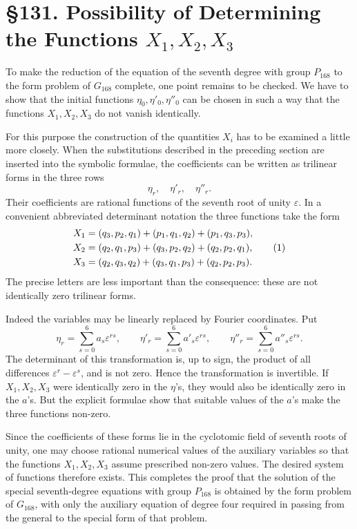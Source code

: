 \documentclass[12pt,a4paper]{article}
\newcommand{\webersection}[2]{\clearpage\section*{\S #1. #2}}
\newcommand{\eps}{\varepsilon}
\begin{document}
\webersection{131}{Possibility of Determining the Functions \(X_1,X_2,X_3\)}

To make the reduction of the equation of the seventh degree with group \(P_{168}\) to the form problem of \(G_{168}\) complete, one point remains to be checked.  We have to show that the initial functions \(\eta_0,\eta'_0,\eta''_0\) can be chosen in such a way that the functions \(X_1,X_2,X_3\) do not vanish identically.

For this purpose the construction of the quantities \(X_i\) has to be examined a little more closely.  When the substitutions described in the preceding section are inserted into the symbolic formulae, the coefficients can be written as trilinear forms in the three rows
\[
 \eta_r,
\quad \eta'_r,
\quad \eta''_r.
\]
Their coefficients are rational functions of the seventh root of unity \(\eps\).  In a convenient abbreviated determinant notation the three functions take the form
\begin{align}
 X_1&=(q_3,p_2,q_1)+(p_1,q_1,q_2)+(p_1,q_3,p_3),\notag\\
 X_2&=(q_2,q_1,p_3)+(q_3,p_2,q_2)+(q_2,p_2,q_1),\tag{1}\\
 X_3&=(q_2,q_3,q_2)+(q_3,q_1,p_3)+(q_2,p_2,p_3).\notag
\end{align}
The precise letters are less important than the consequence: these are not identically zero trilinear forms.

Indeed the variables may be linearly replaced by Fourier coordinates.  Put
\begin{equation}
 \eta_r=\sum_{s=0}^{6}a_s\eps^{rs},
 \qquad
 \eta'_r=\sum_{s=0}^{6}a'_s\eps^{rs},
 \qquad
 \eta''_r=\sum_{s=0}^{6}a''_s\eps^{rs}. \tag{2}
\end{equation}
The determinant of this transformation is, up to sign, the product of all differences \(\eps^r-\eps^s\), and is not zero.  Hence the transformation is invertible.  If \(X_1,X_2,X_3\) were identically zero in the \(\eta\)'s, they would also be identically zero in the \(a\)'s.  But the explicit formulae show that suitable values of the \(a\)'s make the three functions non-zero.

Since the coefficients of these forms lie in the cyclotomic field of seventh roots of unity, one may choose rational numerical values of the auxiliary variables so that the functions \(X_1,X_2,X_3\) assume prescribed non-zero values.  The desired system of functions therefore exists.  This completes the proof that the solution of the special seventh-degree equations with group \(P_{168}\) is obtained by the form problem of \(G_{168}\), with only the auxiliary equation of degree four required in passing from the general to the special form of that problem.
\end{document}

